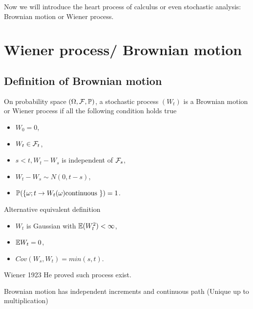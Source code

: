 \newpage
Now we will introduce the heart process of \ito calculus or even stochastic analysis: Brownian motion or Wiener process.
\section{Wiener process/ Brownian motion}
\subsection{Definition of Brownian motion}
\begin{dfn}
On probability space $(\Omega, \mathcal{F}, \mathbb{P})$, a stochastic process $(W_t)$ is a Brownian motion or Wiener process if all the following condition holds true
\begin{itemize}
    \item $W_0 = 0$,
    \item $W_t \in \mathcal{F}_t$,
    \item $s < t, W_t - W_s$ is independent of $\mathcal{F}_s$,
    \item $W_t - W_s \sim N (0, t-s)$,
    \item $\mathbb{P}(\{\omega; t \to W_t(\omega) \text{continuous }\}) = 1$.
\end{itemize}
\end{dfn}


\begin{dfn} Alternative equivalent definition
\begin{itemize}
    \item $W_t$ is Gaussian with $\mathbb{E}(W_t^2) < \infty$,
    \item $\mathbb{E} W_t = 0$,
    \item $Cov(W_s, W_t) = min(s,t)$.
\end{itemize}
\end{dfn}

\begin{thm}{Wiener 1923} He proved such process exist.
\end{thm}

\begin{rem}
Brownian motion has independent increments and continuous path (Unique up to multiplication)
\end{rem}

